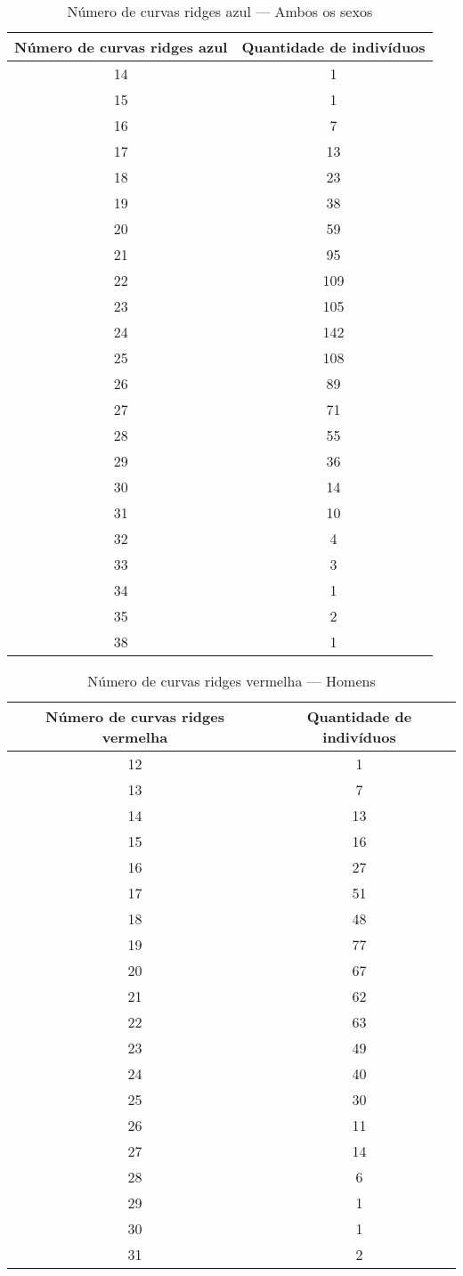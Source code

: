 \documentclass[a4paper,12pt]{article}
\begin{document}
\begin{table}[h!]
\centering
\caption{Número de curvas ridges azul — Ambos os sexos}
\begin{tabular}{c c}
\hline
\textbf{Número de curvas ridges azul} & \textbf{Quantidade de indivíduos} \\ 
\hline
14 & 1  \\
15 & 1  \\
16 & 7  \\
17 & 13 \\
18 & 23 \\
19 & 38 \\
20 & 59 \\
21 & 95 \\
22 & 109 \\
23 & 105 \\
24 & 142 \\
25 & 108 \\
26 & 89 \\
27 & 71 \\
28 & 55 \\
29 & 36 \\
30 & 14 \\
31 & 10 \\
32 & 4  \\
33 & 3  \\
34 & 1  \\
35 & 2  \\
38 & 1  \\
\hline
\end{tabular}
\end{table}


\begin{table}[h!]
\centering
\caption{Número de curvas ridges vermelha — Homens}
\begin{tabular}{c c}
\hline
\textbf{Número de curvas ridges vermelha} & \textbf{Quantidade de indivíduos} \\ 
\hline
12 & 1  \\
13 & 7  \\
14 & 13 \\
15 & 16 \\
16 & 27 \\
17 & 51 \\
18 & 48 \\
19 & 77 \\
20 & 67 \\
21 & 62 \\
22 & 63 \\
23 & 49 \\
24 & 40 \\
25 & 30 \\
26 & 11 \\
27 & 14 \\
28 & 6  \\
29 & 1  \\
30 & 1  \\
31 & 2  \\
\hline
\end{tabular}
\end{table}
\end{document}
